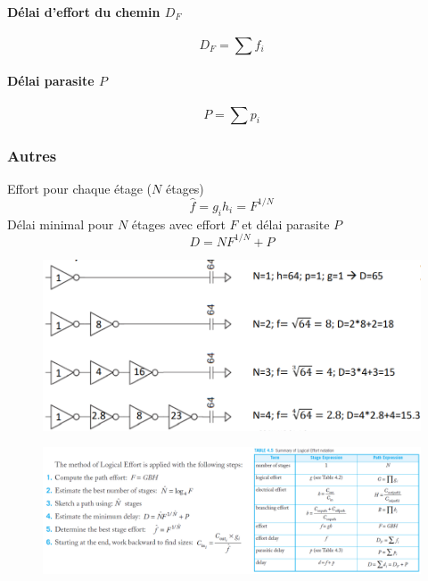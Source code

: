 \documentclass[resume]{subfiles}
\begin{document}
\begin{multicols}{3}
\paragraph{Délai d'effort du chemin $D_F$}
$$D_F=\sum f_i$$
\paragraph{Délai parasite $P$}
$$P=\sum p_i$$
\subsubsection{Autres}
Effort pour chaque étage ($N$ étages)
$$\hat{f}=g_ih_i=F^{1/N}$$
Délai minimal pour $N$ étages avec effort $F$ et délai parasite $P$
$$D=NF^{1/N}+P$$
\begin{figure}[H]
\centering
\includegraphics[width=\columnwidth]{img_50.png}
\end{figure}
\end{multicols}
\begin{figure}[H]
\centering
\includegraphics[width=16.00cm]{img_51.png}
\end{figure}
\end{document}
